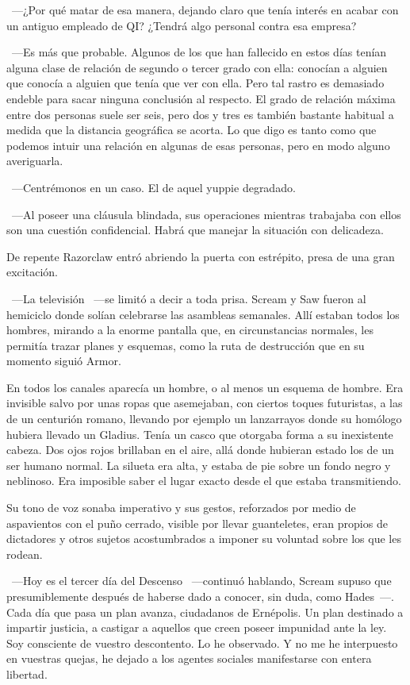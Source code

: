 ~---¿Por qué matar de esa manera, dejando claro que tenía interés en acabar con un antiguo empleado de QI? ¿Tendrá algo personal contra esa empresa?

~---Es más que probable. Algunos de los que han fallecido en estos días tenían alguna clase de relación de segundo o tercer grado con ella: conocían a alguien que conocía a alguien que tenía que ver con ella. Pero tal rastro es demasiado endeble para sacar ninguna conclusión al respecto. El grado de relación máxima entre dos personas suele ser seis, pero dos y tres es también bastante habitual a medida que la distancia geográfica se acorta. Lo que digo es tanto como que podemos intuir una relación en algunas de esas personas, pero en modo alguno averiguarla.

~---Centrémonos en un caso. El de aquel yuppie degradado.

~---Al poseer una cláusula blindada, sus operaciones mientras trabajaba con ellos son una cuestión confidencial. Habrá que manejar la situación con delicadeza.

De repente Razorclaw entró abriendo la puerta con estrépito, presa de una gran excitación.

~---La televisión ~---se limitó a decir a toda prisa. Scream y Saw fueron al hemiciclo donde solían celebrarse las asambleas semanales. Allí estaban todos los hombres, mirando a la enorme pantalla que, en circunstancias normales, les permitía trazar planes y esquemas, como la ruta de destrucción que en su momento siguió Armor.

En todos los canales aparecía un hombre, o al menos un esquema de hombre. Era invisible salvo por unas ropas que asemejaban, con ciertos toques futuristas, a las de un centurión romano, llevando por ejemplo un lanzarrayos donde su homólogo hubiera llevado un Gladius. Tenía un casco que otorgaba forma a su inexistente cabeza. Dos ojos rojos brillaban en el aire, allá donde hubieran estado los de un ser humano normal. La silueta era alta, y estaba de pie sobre un fondo negro y neblinoso. Era imposible saber el lugar exacto desde el que estaba transmitiendo.

Su tono de voz sonaba imperativo y sus gestos, reforzados por medio de aspavientos con el puño cerrado, visible por llevar guanteletes, eran propios de dictadores y otros sujetos acostumbrados a imponer su voluntad sobre los que les rodean.

~---Hoy es el tercer día del Descenso ~---continuó hablando, Scream supuso que presumiblemente después de haberse dado a conocer, sin duda, como Hades~---. Cada día que pasa un plan avanza, ciudadanos de Ernépolis. Un plan destinado a impartir justicia, a castigar a aquellos que creen poseer impunidad ante la ley. Soy consciente de vuestro descontento. Lo he observado. Y no me he interpuesto en vuestras quejas, he dejado a los agentes sociales manifestarse con entera libertad.

